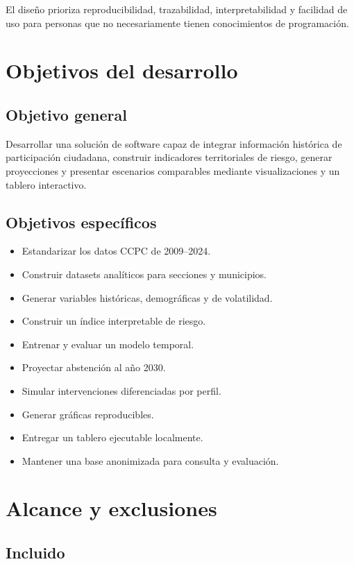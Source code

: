 \documentclass[11pt,a4paper]{article}
\begin{document}
El diseño prioriza reproducibilidad, trazabilidad, interpretabilidad y facilidad de uso para personas que no necesariamente tienen conocimientos de programación.

\section{Objetivos del desarrollo}

\subsection{Objetivo general}

Desarrollar una solución de software capaz de integrar información histórica de participación ciudadana, construir indicadores territoriales de riesgo, generar proyecciones y presentar escenarios comparables mediante visualizaciones y un tablero interactivo.

\subsection{Objetivos específicos}

\begin{itemize}
    \item Estandarizar los datos CCPC de 2009--2024.
    \item Construir datasets analíticos para secciones y municipios.
    \item Generar variables históricas, demográficas y de volatilidad.
    \item Construir un índice interpretable de riesgo.
    \item Entrenar y evaluar un modelo temporal.
    \item Proyectar abstención al año 2030.
    \item Simular intervenciones diferenciadas por perfil.
    \item Generar gráficas reproducibles.
    \item Entregar un tablero ejecutable localmente.
    \item Mantener una base anonimizada para consulta y evaluación.
\end{itemize}

\section{Alcance y exclusiones}

\subsection{Incluido}
\end{document}
